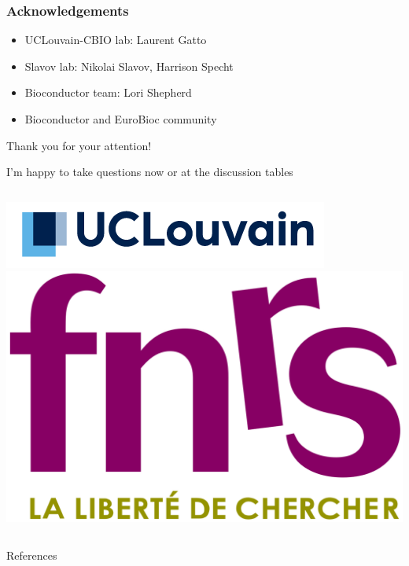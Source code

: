 \documentclass{beamer}
\begin{document}
\begin{frame}[b]
  \frametitle{Acknowledgements}
  \centering
  
  \begin{itemize}
    \item UCLouvain-CBIO lab: Laurent Gatto
    \item Slavov lab: Nikolai Slavov,  Harrison Specht
    \item Bioconductor team: Lori Shepherd
    \item Bioconductor and EuroBioc community
    
  \end{itemize}
  
  \vfill
  Thank you for your attention!

  \footnotesize 
  I'm happy to take questions now or at the discussion tables
  
  \vfill
  \begin{columns}
    \includegraphics[width=\linewidth]{figs/ucl.png}
    \includegraphics[width=\linewidth]{figs/fnrs.png}
  \end{columns}
\end{frame}




\begin{frame}[allowframebreaks]{References}
  \scriptsize
  
  
\end{frame}
\end{document}
